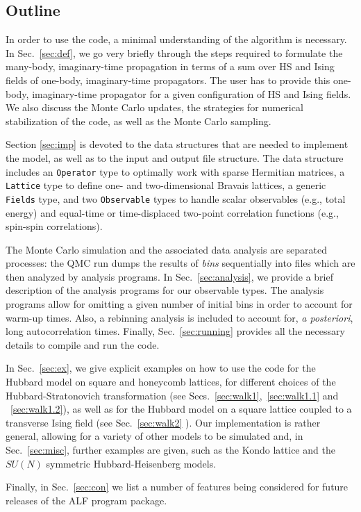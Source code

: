 \subsection{Outline}

In order to use the code, a minimal understanding of the algorithm is necessary. 
In Sec.~\ref{sec:def}, we go very briefly through  the steps required  to formulate the many-body, imaginary-time propagation in terms of a sum  over HS and Ising fields  of one-body,  imaginary-time propagators.   
The user has to provide this one-body, imaginary-time propagator for a given configuration of   HS and  Ising fields. 
We also discuss the Monte Carlo updates, the strategies for numerical stabilization of the code, as well as the Monte Carlo sampling.

Section \ref{sec:imp} is devoted to the data structures that are needed to implement the model, as well as to the input and output file structure.   
The data structure includes an \texttt{Operator} type to optimally work with sparse Hermitian matrices, a \texttt{Lattice} type  to define one- and two-dimensional Bravais lattices, a generic \texttt{Fields} type, and two \texttt{Observable} types to handle scalar observables (e.g., total energy) and equal-time or time-displaced two-point correlation functions (e.g., spin-spin correlations).

The Monte Carlo simulation and the associated data analysis are separated processes: the QMC run  dumps the results of \emph{bins}  sequentially into files  which are then analyzed by  analysis programs. In Sec.~\ref{sec:analysis}, we provide a brief description of the analysis programs  for our  observable types.  The analysis programs allow for omitting a given number of initial bins in order to account for warm-up times. Also, a rebinning analysis is included  to account for, \emph{a posteriori}, long autocorrelation times.  Finally, Sec.~\ref{sec:running} provides all the necessary details  to compile and run the code. 




In Sec.~\ref{sec:ex}, we  give explicit examples on how to use the code for  the  Hubbard model on square and honeycomb lattices,  for different choices of the Hubbard-Stratonovich transformation  (see Secs.~\ref{sec:walk1},~\ref{sec:walk1.1} and ~\ref{sec:walk1.2}), as well as for the Hubbard model on a square lattice coupled to a transverse Ising field (see Sec.~\ref{sec:walk2} ).   Our implementation is rather general, allowing for a variety of other models to be simulated and, in Sec.~\ref{sec:misc}, further examples are given, such as the Kondo lattice and the $SU(N)$ symmetric Hubbard-Heisenberg models.

Finally, in Sec.~\ref{sec:con} we list a number of features being considered for  future releases of the ALF program package.
